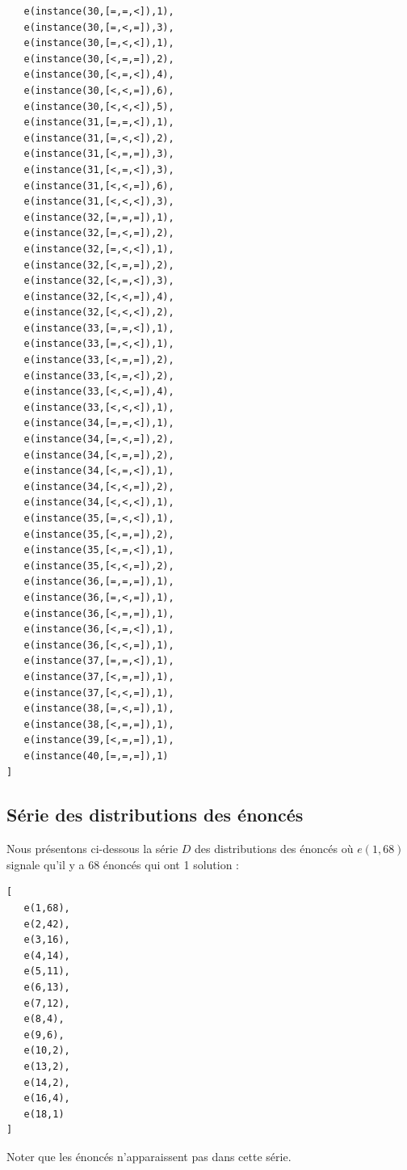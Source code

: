 \documentclass[a4paper, 12]{article}
\begin{document}
\begin{verbatim}
   e(instance(30,[=,=,<]),1),
   e(instance(30,[=,<,=]),3),
   e(instance(30,[=,<,<]),1),
   e(instance(30,[<,=,=]),2),
   e(instance(30,[<,=,<]),4),
   e(instance(30,[<,<,=]),6),
   e(instance(30,[<,<,<]),5),
   e(instance(31,[=,=,<]),1),
   e(instance(31,[=,<,<]),2),
   e(instance(31,[<,=,=]),3),
   e(instance(31,[<,=,<]),3),
   e(instance(31,[<,<,=]),6),
   e(instance(31,[<,<,<]),3),
   e(instance(32,[=,=,=]),1),
   e(instance(32,[=,<,=]),2),
   e(instance(32,[=,<,<]),1),
   e(instance(32,[<,=,=]),2),
   e(instance(32,[<,=,<]),3),
   e(instance(32,[<,<,=]),4),
   e(instance(32,[<,<,<]),2),
   e(instance(33,[=,=,<]),1),
   e(instance(33,[=,<,<]),1),
   e(instance(33,[<,=,=]),2),
   e(instance(33,[<,=,<]),2),
   e(instance(33,[<,<,=]),4),
   e(instance(33,[<,<,<]),1),
   e(instance(34,[=,=,<]),1),
   e(instance(34,[=,<,=]),2),
   e(instance(34,[<,=,=]),2),
   e(instance(34,[<,=,<]),1),
   e(instance(34,[<,<,=]),2),
   e(instance(34,[<,<,<]),1),
   e(instance(35,[=,<,<]),1),
   e(instance(35,[<,=,=]),2),
   e(instance(35,[<,=,<]),1),
   e(instance(35,[<,<,=]),2),
   e(instance(36,[=,=,=]),1),
   e(instance(36,[=,<,=]),1),
   e(instance(36,[<,=,=]),1),
   e(instance(36,[<,=,<]),1),
   e(instance(36,[<,<,=]),1),
   e(instance(37,[=,=,<]),1),
   e(instance(37,[<,=,=]),1),
   e(instance(37,[<,<,=]),1),
   e(instance(38,[=,<,=]),1),
   e(instance(38,[<,=,=]),1),
   e(instance(39,[<,=,=]),1),
   e(instance(40,[=,=,=]),1)
]
\end{verbatim}

\subsection{Série des distributions des énoncés}
\label{annexe2}

Nous présentons ci-dessous la série $D$ des distributions des énoncés où $e(1,68)$ signale qu'il y a 68 énoncés qui ont 1 solution :
\begin{verbatim}
[
   e(1,68),
   e(2,42),
   e(3,16),
   e(4,14),
   e(5,11),
   e(6,13),
   e(7,12),
   e(8,4),
   e(9,6),
   e(10,2),
   e(13,2),
   e(14,2),
   e(16,4),
   e(18,1)
]
\end{verbatim}

Noter que les énoncés n'apparaissent pas dans cette série.
\end{document}
